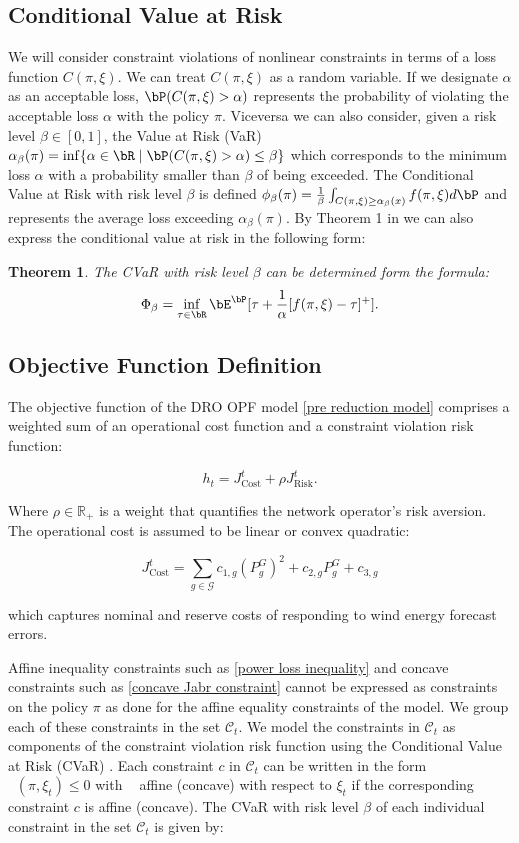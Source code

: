 \documentclass[11pt,a4paper,oneside,openany]{book}
\DeclareMathOperator{\C}{C_{tc}}
\newtheorem{theorem}{Theorem}
\numberwithin{definition}{section}
\numberwithin{theorem}{section}
\numberwithin{problem}{section}
\begin{document}
\subsection{Conditional Value at Risk}
We will consider constraint violations of nonlinear constraints in terms of a loss function $C(\pi,\xi)$. We can treat $C(\pi,\xi)$ as a random variable. If we designate $\alpha$ as an acceptable loss, $\bP(C(\pi,\xi) > \alpha)$ represents the probability of violating the acceptable loss $\alpha$ with the policy $\pi$. Viceversa we can also consider, given a risk level $\beta \in [0,1]$, the Value at Risk (VaR) \(\alpha_{\beta} (\pi) =  \inf\{\alpha \in \bR \mid \bP(C(\pi,\xi) > \alpha ) \leq \beta\}\) which corresponds to the minimum loss $\alpha$ with a probability smaller than  $\beta$ of being exceeded. The Conditional Value at Risk with risk level $\beta$ is defined \(\phi_{\beta}(\pi) =  \frac{1}{\beta} \int_{C(\pi,\xi) \geq \alpha_{\beta}(x)} f(\pi,\xi) d\bP\) and represents the average loss exceeding $\alpha_{\beta}(\pi)$.
By Theorem 1 in \cite{Rockafellar2000OptimizationOC} we can also express the conditional value at risk in the following form:
\begin{theorem}
The CVaR with risk level $\beta$ can be determined form the formula:
\begin{equation}
    \Phi_{\beta} = \inf_{\tau \in \bR}\bE^{\bP}[\tau + \frac{1}{\alpha}[f(\pi,\xi)-\tau]^+].
\end{equation}
\end{theorem}
\subsection{Objective Function Definition}

The objective function of the DRO OPF model \eqref{pre reduction model} comprises a weighted sum of an operational cost function and a constraint violation risk function:

\[ h_t = J^t_{\text{Cost}} + \rho J^t_{\text{Risk}}. \]

Where $\rho \in \mathbb{R}_+$ is a weight that quantifies the network operator's risk aversion. The operational cost is assumed to be linear or convex quadratic:

\[ J^t_{\text{Cost}} = \sum_{g \in \mathcal{G}} c_{1,g}(P_g^G)^2 + c_{2,g}P_g^G + c_{3,g} \]

which captures nominal and reserve costs of responding to wind energy forecast errors.

Affine inequality constraints such as \eqref{power loss inequality} and concave constraints such as \eqref{concave Jabr constraint} cannot be expressed as constraints on the policy $\pi$ as done for the affine equality constraints of the model. We group each of these constraints in the set $\mathcal{C}_t$. We model the constraints in $\mathcal{C}_t$ as components of the constraint violation risk function using the Conditional Value at Risk (CVaR) \cite{Rockafellar2000OptimizationOC}. Each constraint $c$ in $\mathcal{C}_t$ can be written in the form $\C(\pi,\xi_t) \leq 0$ with $\C$ affine (concave) with respect to $\xi_t$ if the corresponding constraint $c$ is affine (concave). The CVaR with risk level $\beta$ of each individual constraint in the set $\mathcal{C}_t$ is given by:
\end{document}

